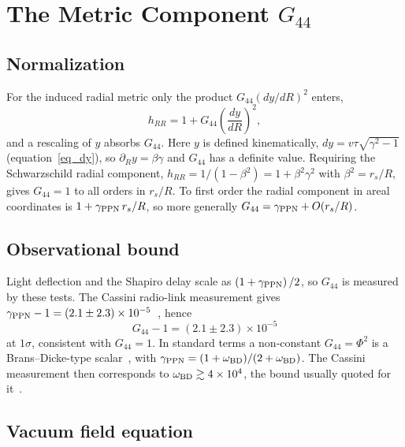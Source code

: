 \documentclass[pdflatex,sn-mathphys-num]{sn-jnl}%
\theoremstyle{thmstyleone}%
\theoremstyle{thmstyletwo}%
\theoremstyle{thmstylethree}%
\begin{document}
\section{The Metric Component $G_{44}$}\label{sec_scalar}

\subsection{Normalization}

For the induced radial metric only the product $G_{44}(dy/dR)^2$ enters,
\begin{equation}
    h_{RR}=1+G_{44}\left(\frac{dy}{dR}\right)^2 ,
\end{equation}
and a rescaling of $y$ absorbs $G_{44}$. Here $y$ is defined kinematically, $dy=v\tau\sqrt{\gamma^2-1}$ (equation~\eqref{eq_dy}), so $\partial_Ry=\beta\gamma$ and $G_{44}$ has a definite value. Requiring the Schwarzschild radial component, $h_{RR}=1/(1-\beta^2)=1+\beta^2\gamma^2$ with $\beta^2=r_s/R$, gives $G_{44}=1$ to all orders in $r_s/R$. To first order the radial component in areal coordinates is $1+\gamma_{\rm PPN}\,r_s/R$, so more generally $G_{44}=\gamma_{\rm PPN}+O(r_s/R)$.

\subsection{Observational bound}

Light deflection and the Shapiro delay scale as $\left(1+\gamma_{\rm PPN}\right)/2$, so $G_{44}$ is measured by these tests. The Cassini radio-link measurement gives $\gamma_{\rm PPN}-1=(2.1\pm2.3)\times10^{-5}$~\cite{Bertotti2003}, hence
\begin{equation}
    G_{44}-1=(2.1\pm2.3)\times10^{-5}
\end{equation}
at $1\sigma$, consistent with $G_{44}=1$. In standard terms a non-constant $G_{44}=\Phi^2$ is a Brans--Dicke-type scalar~\cite{BransDicke1961,OverduinWesson1997}, with $\gamma_{\rm PPN}=(1+\omega_{\rm BD})/(2+\omega_{\rm BD})$. The Cassini measurement then corresponds to $\omega_{\rm BD}\gtrsim4\times10^4$, the bound usually quoted for it~\cite{Bertotti2003}.

\subsection{Vacuum field equation}
\end{document}
